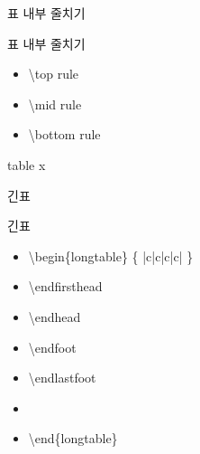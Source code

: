 \documentclass[ aspectratio=149,  10pt,blue,xcolor=pdftex,dvipsnames,table,handout,notes]{beamer}
\begin{document}
		\begin{frame}[t]{표 내부 줄치기}

		\begin{block}{표 내부 줄치기}
		\begin{itemize}
		\item[]	\textbackslash top rule
		\item[]	\textbackslash mid rule
		\item[]	\textbackslash bottom rule
		\end{itemize}
		\end{block}



		\note[item]{}
		\end{frame}



		\begin{frame}[t]{table x}

		\note[item]{}
		\end{frame}


		\begin{frame}[t]{긴표}

		\begin{block}{긴표}
		\begin{itemize}
		\item[]	\textbackslash begin\{longtable\} \{ |c|c|c|c| \}
		\item[]	\hspace{2em} \textbackslash endfirsthead
		\item[]	\hspace{2em} \textbackslash endhead
		\item[]	\hspace{2em} \textbackslash endfoot
		\item[]	\hspace{2em} \textbackslash endlastfoot
		\item[]	
		\item[]	\textbackslash end\{longtable\} 
		\end{itemize}
		\end{block}



		\note[item]{}
		\end{frame}
\end{document}
